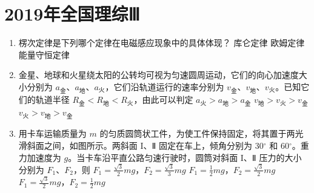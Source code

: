 \documentclass[\gkver]{gaokaozhenti}
\begin{document}
\chapter{2019年全国理综Ⅲ}

\begin{enumerate}
\item
楞次定律是下列哪个定律在电磁感应现象中的具体体现？
{库仑定律}
{欧姆定律}
{能量守恒定律}


\item
金星、地球和火星绕太阳的公转均可视为匀速圆周运动，它们的向心加速度大小分别为 $a_{\text{金}}$、$a_{\text{地}}$、$a_{\text{火}}$，它们沿轨道运行的速率分别为 $v_{\text{金}}$、$v_{\text{地}}$、$v_{\text{火}}$。已知它们的轨道半径 $R_{\text{金}} < R_{\text{地}} < R_{\text{火}}$，由此可以判定
{$a_{\text{火}} > a_{\text{地}} > a_{\text{金}}$}
{$v_{\text{地}} > v_{\text{火}} > v_{\text{金}}$}
{$v_{\text{火}} > v_{\text{地}} > v_{\text{金}}$}


\item
用卡车运输质量为 $m$ 的匀质圆筒状工件，为使工件保持固定，将其置于两光滑斜面之间，如图所示。两斜面 I、Ⅱ 固定在车上，倾角分别为 30${^\circ}$ 和 60${^\circ}$。重力加速度为 $g$。当卡车沿平直公路匀速行驶时，圆筒对斜面 I、Ⅱ 压力的大小分别为 $F_{1}$、$F_{2}$，则
{$F_{1} = \frac{{\sqrt 3 }}{2}mg$，$F_{2} = \frac{{\sqrt 3 }}{3}mg$}
{$F_{1} = \frac{1}{2}mg$，$F_{2} = \frac{{\sqrt 3 }}{2}mg$}
{$F_{1} = \frac{{\sqrt 3 }}{2}mg$，$F_{2} = \frac{1}{2}mg$}


\end{enumerate}
\end{document}
